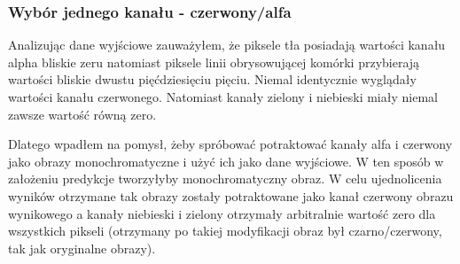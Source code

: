 \documentclass{article}
\begin{document}
\subsubsection{Wybór jednego kanału - czerwony/alfa}
Analizując dane wyjściowe zauważyłem, że piksele tła posiadają wartości kanału alpha bliskie zeru natomiast piksele linii obrysowującej komórki przybierają wartości bliskie dwustu pięćdziesięciu pięciu.
Niemal identycznie wyglądały wartości kanału czerwonego.
Natomiast kanały zielony i niebieski miały niemal zawsze wartość równą zero.

Dlatego wpadłem na pomysł, żeby spróbować potraktować kanały alfa i czerwony jako obrazy monochromatyczne i użyć ich jako dane wyjściowe.
W ten sposób w założeniu predykcje tworzyłyby monochromatyczny obraz. W celu ujednolicenia wyników otrzymane tak obrazy zostały potraktowane jako kanał czerwony obrazu wynikowego a kanały niebieski i zielony otrzymały arbitralnie wartość zero dla wszystkich pikseli (otrzymany po takiej modyfikacji obraz był czarno/czerwony, tak jak oryginalne obrazy).
\end{document}
